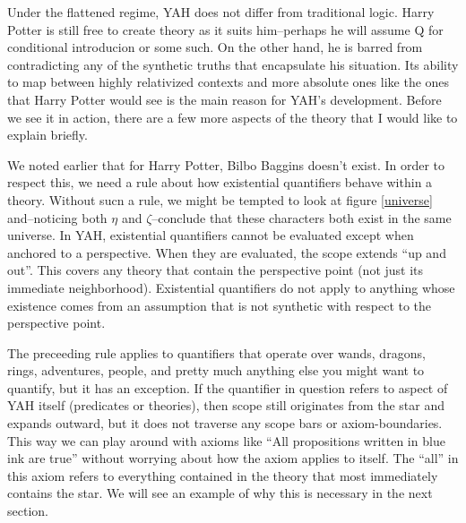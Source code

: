 \documentclass[12pt]{article}
\begin{document}
\begin{flushleft}
Under the flattened regime, YAH does not differ from traditional logic.
Harry Potter is still free to create theory as it suits him--perhaps he will assume Q for conditional introducion or some such.
On the other hand, he is barred from contradicting any of the synthetic truths that encapsulate his situation.
Its ability to map between highly relativized contexts and more absolute ones like the ones that Harry Potter would see is the main reason for YAH's development.
Before we see it in action, there are a few more aspects of the theory that I would like to explain briefly.

We noted earlier that for Harry Potter, Bilbo Baggins doesn't exist.
In order to respect this, we need a rule about how existential quantifiers behave within a theory.
Without sucn a rule, we might be tempted to look at figure \ref{universe} and--noticing both $\eta$ and $\zeta$--conclude that these characters both exist in the same universe.
In YAH, existential quantifiers cannot be evaluated except when anchored to a perspective.
When they are evaluated, the scope extends ``up and out''.
This covers any theory that contain the perspective point (not just its immediate neighborhood).
Existential quantifiers do not apply to anything whose existence comes from an assumption that is not synthetic with respect to the perspective point\footnotemark.

The preceeding rule applies to quantifiers that operate over wands, dragons, rings, adventures, people, and pretty much anything else you might want to quantify, but it has an exception.
If the quantifier in question refers to aspect of YAH itself (predicates or theories), then scope still originates from the star and expands outward, but it does not traverse any scope bars or axiom-boundaries.
This way we can play around with axioms like ``All propositions written in blue ink are true'' without worrying about how the axiom applies to itself.
The ``all'' in this axiom refers to everything contained in the theory that most immediately contains the star.
We will see an example of why this is necessary in the next section.

\begin{figure}[h]
    \centering
    \hspace*{17em}%
    \fitchprf
    {
    }
    {
        \subproof
        {
        }
        {
            \pline{\bigstar}
        }
    }
    \caption{}
    \label{contradiction}
\end{figure}


\end{flushleft}
\end{document}
